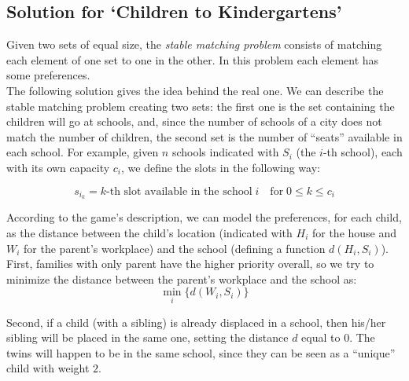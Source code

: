\documentclass{article}
\begin{document}
\subsection{Solution for `Children to Kindergartens'}

Given two sets of equal size, the \textit{stable matching problem} consists of matching each element of one set to one in the other. In this 
problem each element has some preferences.\\

\noindent The following solution gives the idea behind the real one. We can describe the stable matching problem creating two sets: the first one is the set containing the children will go at schools, and, since the number
of schools of a city does not match the number of children, the second set is the number of ``seats'' available in each school.
For example, given $n$ schools indicated with $S_i$ (the $i$-th school), each with its own capacity $c_i$,
we define the slots in the following way:

\begin{equation*}
    s_{i_{k}} = k\textrm{-th slot available in the school} \; i \quad \textrm{for} \; 0 \le k \le c_i
\end{equation*}

\noindent According to the game's description, we can model the preferences, for each child, as the distance between the child's location (indicated with $H_i$ for the house and $W_i$ for the parent's workplace) and the school (defining a function $d(H_i, S_i)$). \\

\noindent First, families with only parent have the higher priority overall, so we try to minimize the distance between the parent's workplace and the school as:
\begin{equation*}
    \min_{i} \{d(W_i, S_i)  \}
\end{equation*}

\noindent Second, if a child (with a sibling) is already displaced in a school, then his/her sibling will be placed in the same one, setting the distance $d$ equal to $0$. 
The twins will happen to be in the same school, since they can be seen as a ``unique'' child with weight $2$.
\end{document}
